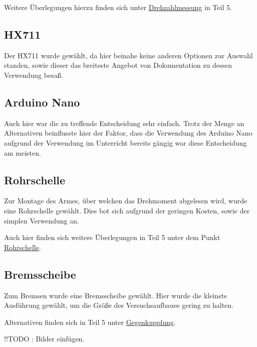 Weitere Überlegungen hierzu finden sich unter \hyperref[drehzahlmessung]{Drehzahlmessung} in Teil 5.

\subsection{HX711}

Der HX711 wurde gewählt, da hier beinahe keine anderen Optionen zur Auswahl standen, sowie dieser das breiteste Angebot von Dokumentation zu dessen Verwendung besaß.

\subsection{Arduino Nano}

Auch hier war die zu treffende Entscheidung sehr einfach.
Trotz der Menge an Alternativen beinflusste hier der Faktor, dass die Verwendung des Arduino Nano aufgrund der Verwendung im Unterricht bereits gängig war diese Entscheidung am meisten.

\subsection{Rohrschelle}

Zur Montage des Armes, über welchen das Drehmoment abgelesen wird, wurde eine Rohrschelle gewählt.
Dies bot sich aufgrund der geringen Kosten, sowie der simplen Verwendung an.

Auch hier finden sich weitere Überlegungen in Teil 5 unter dem Punkt \hyperref[rohrschelle]{Rohrschelle}.

\subsection{Bremsscheibe}

Zum Bremsen wurde eine Bremsscheibe gewählt.
Hier wurde die kleinste Ausführung gewählt, um die Größe des Versuchsaufbaues gering zu halten.

Alternativen finden sich in Teil 5 unter \hyperref[gegenkupplung]{Gegenkupplung}.



!!TODO : Bilder einfügen.